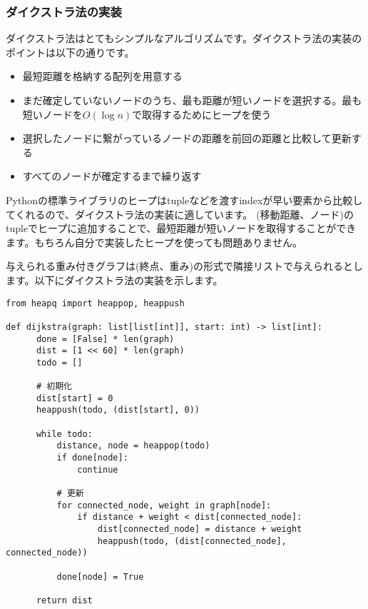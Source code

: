 \documentclass{jlreq}
\begin{document}
\vspace{0.5cm}

\subsubsection{ダイクストラ法の実装}
ダイクストラ法はとてもシンプルなアルゴリズムです。ダイクストラ法の実装のポイントは以下の通りです。

\begin{itemize}
  \item 最短距離を格納する配列を用意する
  \item まだ確定していないノードのうち、最も距離が短いノードを選択する。最も短いノードを$O(\log n)$で取得するためにヒープを使う
  \item 選択したノードに繋がっているノードの距離を前回の距離と比較して更新する
  \item すべてのノードが確定するまで繰り返す
\end{itemize}

Pythonの標準ライブラリのヒープはtupleなどを渡すindexが早い要素から比較してくれるので、ダイクストラ法の実装に適しています。
(移動距離、ノード)のtupleでヒープに追加することで、最短距離が短いノードを取得することができます。もちろん自分で実装したヒープを使っても問題ありません。

与えられる重み付きグラフは(終点、重み)の形式で隣接リストで与えられるとします。以下にダイクストラ法の実装を示します。
\begin{lstlisting}[caption=ダイクストラ法の実装, label=dijkstra, frame=TRBL, label={dijkstra}]
from heapq import heappop, heappush

def dijkstra(graph: list[list[int]], start: int) -> list[int]:
      done = [False] * len(graph)
      dist = [1 << 60] * len(graph)
      todo = []
      
      # 初期化
      dist[start] = 0
      heappush(todo, (dist[start], 0))
      
      while todo:
          distance, node = heappop(todo)
          if done[node]:
              continue
          
          # 更新
          for connected_node, weight in graph[node]:
              if distance + weight < dist[connected_node]:
                  dist[connected_node] = distance + weight
                  heappush(todo, (dist[connected_node], connected_node))
          
          done[node] = True
      
      return dist
                  
\end{lstlisting}
\end{document}
